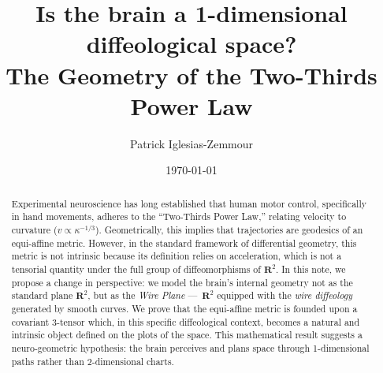 \documentclass[10pt,letterpaper,reqno]{amsart}
\title[Is the brain a 1-dimensional diffeological space?]{Is the brain a 1-dimensional diffeological space?\\
\small The Geometry of the Two-Thirds Power Law}
\author{Patrick Iglesias-Zemmour}
\date{\today}
\newcommand{\RR}{\mathbf{R}}
\begin{document}
  
  
  \begin{abstract}
    Experimental neuroscience has long established that human motor control,
    specifically in hand movements,
    adheres to the ``Two-Thirds Power Law,''
    relating velocity to curvature ($v \propto \kappa^{-1/3}$).
    Geometrically,
    this implies that trajectories are geodesics of an equi-affine metric.
    However,
    in the standard framework of differential geometry,
    this metric is not intrinsic because its definition relies on acceleration,
    which is not a tensorial quantity under the full group of diffeomorphisms of $\RR^2$.
    In this note,
    we propose a change in perspective:
    we model the brain's internal geometry not as the standard plane $\RR^2$,
    but as the \emph{Wire Plane}
    ---~$\RR^2$ equipped with the \emph{wire diffeology} generated by smooth curves.
    We prove that the equi-affine metric is founded upon a covariant 3-tensor which,
    in this specific diffeological context,
    becomes a natural and intrinsic object defined on the plots of the space.
    This mathematical result suggests a neuro-geometric hypothesis:
    the brain perceives and plans space through 1-dimensional paths rather than 2-dimensional charts.
  \end{abstract}
  

  
  \maketitle
  
\end{document}

